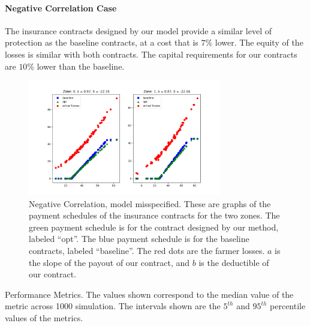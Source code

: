 \documentclass[11pt]{article}
\begin{document}
      \paragraph{Negative Correlation Case} The insurance contracts designed by our model provide a similar level of protection as the baseline contracts, at a cost that is $7\%$ lower. The equity of the losses is similar with both contracts. The capital requirements for our contracts are $10\%$ lower than the baseline. 
      \begin{figure}[H]
          \centering
          \includegraphics[width=0.75\textwidth]{../../output/figures/Bootstrap/neg_corr_nonlinear.png}
          \caption{Negative Correlation, model misspecified. These are graphs of the payment schedules of the insurance contracts for the two zones. The green payment schedule is for the contract designed by our method, labeled ``opt''. The blue payment schedule is for the baseline contracts, labeled ``baseline''. The red dots are the farmer losses. $a$ is the slope of the payout of our contract, and $b$ is the deductible of our contract.}
      \end{figure}

      \begin{table}[H]
          \centering
          
          
          \caption{Performance Metrics. The values shown correspond to the median value of the metric across 1000 simulation. The intervals shown are the $5^{th}$ and $95^{th}$ percentile values of the metrics.}
      \end{table}
      \FloatBarrier
    
\end{document}
